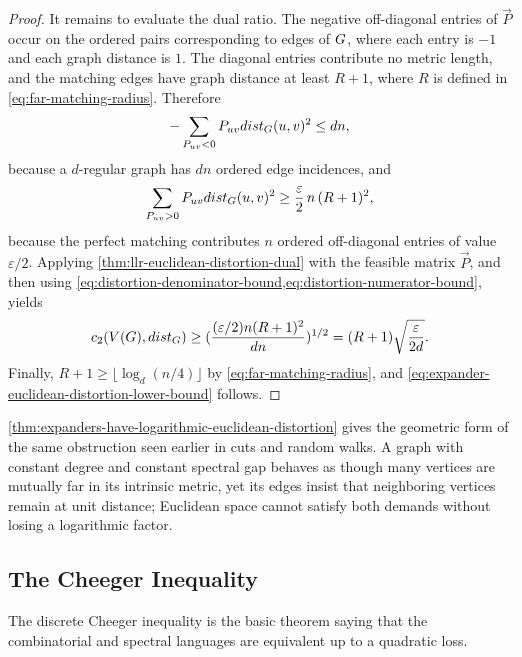 \begin{proof}
	It remains to evaluate the dual ratio. The negative off-diagonal entries of \(\vec{P}\) occur on the ordered pairs corresponding to edges of \(G\), where each entry is \(-1\) and each graph distance is \(1\). The diagonal entries contribute no metric length, and the matching edges have graph distance at least \(R+1\), where \(R\) is defined in \cref{eq:far-matching-radius}. Therefore
	\begin{equation}
		\label{eq:distortion-denominator-bound}
		-\sum_{P_{uv}<0}P_{uv}dist_{G}(u,v)^2\leq dn,
	\end{equation}
	because a \(d\)-regular graph has \(dn\) ordered edge incidences, and
	\begin{equation}
		\label{eq:distortion-numerator-bound}
		\sum_{P_{uv}>0}P_{uv}dist_{G}(u,v)^2
		\geq
		\frac{\varepsilon}{2}\,n\,(R+1)^2,
	\end{equation}
	because the perfect matching contributes \(n\) ordered off-diagonal entries of value \(\varepsilon/2\). Applying \cref{thm:llr-euclidean-distortion-dual} with the feasible matrix \(\vec{P}\), and then using \cref{eq:distortion-denominator-bound,eq:distortion-numerator-bound}, yields
	\begin{equation}
		\label{eq:distortion-final-ratio}
		c_2(V(G),dist_{G})
		\geq
		(
		\frac{(\varepsilon/2)n(R+1)^2}{dn}
		)^{1/2}
		=(R+1)\sqrt{\frac{\varepsilon}{2d}}.
	\end{equation}
	Finally, \(R+1\geq \lfloor\log_d(n/4)\rfloor\) by \cref{eq:far-matching-radius}, and \cref{eq:expander-euclidean-distortion-lower-bound} follows.
\end{proof}

\cref{thm:expanders-have-logarithmic-euclidean-distortion} gives the geometric form of the same obstruction seen earlier in cuts and random walks. A graph with constant degree and constant spectral gap behaves as though many vertices are mutually far in its intrinsic metric, yet its edges insist that neighboring vertices remain at unit distance; Euclidean space cannot satisfy both demands without losing a logarithmic factor.

\subsection{The Cheeger Inequality}
\label{subsec:cheeger}

The discrete Cheeger inequality is the basic theorem saying that the combinatorial and spectral languages are equivalent up to a quadratic loss.

